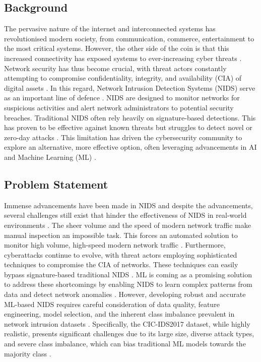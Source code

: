 \subsection{Background}
The pervasive nature of the internet and interconnected systems has revolutionised modern society, from communication, commerce, entertainment to the most critical systems. However, the other side of the coin is that this increased connectivity has exposed systems to ever-increasing cyber threats \parencite{googlecloud2025threat, govuk2025cyber}. Network security has thus become crucial, with threat actors constantly attempting to compromise confidentiality, integrity, and availability (CIA) of digital assets \parencite{itgovernance2025cia, securityscorecard2025cia}. In this regard, Network Intrusion Detection Systems (NIDS) serve as an important line of defence \parencite{sharma2024advancements}. NIDS are designed to monitor networks for suspicious activities and alert network administrators to potential security breaches. Traditional NIDS often rely heavily on signature-based detections. This has proven to be effective against known threats but struggles to detect novel or zero-day attacks \parencite{kaur2024challenges, ali2024challenges}. This limitation has driven the cybersecurity community to explore an alternative, more effective option, often leveraging advancements in AI and Machine Learning (ML) \parencite{singh2025comparative, akoto2024machine}.

\subsection{Problem Statement}
Immense advancements have been made in NIDS and despite the advancements, several challenges still exist that hinder the effectiveness of NIDS in real-world environments \parencite{sharma2024advancements, bistech2025networking}. The sheer volume and the speed of modern network traffic make manual inspection an impossible task. This forces an automated solution to monitor high volume, high-speed modern network traffic \parencite{bistech2025networking, researchgate2024challenges}. Furthermore, cyberattacks continue to evolve, with threat actors employing sophisticated techniques to compromise the CIA of networks. These techniques can easily bypass signature-based traditional NIDS \parencite{prophaze2025ids, researchgate2025comparative}. ML is coming as a promising solution to address these shortcomings by enabling NIDS to learn complex patterns from data and detect network anomalies \parencite{brilliance2025ml, irjmets2025nids}. However, developing robust and accurate ML-based NIDS requires careful consideration of data quality, feature engineering, model selection, and the inherent class imbalance prevalent in network intrusion datasets \parencite{semanticscholar2025imbalanced, arxiv2025defensive}. Specifically, the CIC-IDS2017 dataset, while highly realistic, presents significant challenges due to its large size, diverse attack types, and severe class imbalance, which can bias traditional ML models towards the majority class \parencite{unb2017cicids, rdiscovery2025cicids, pubmedcentral2025ids}.

